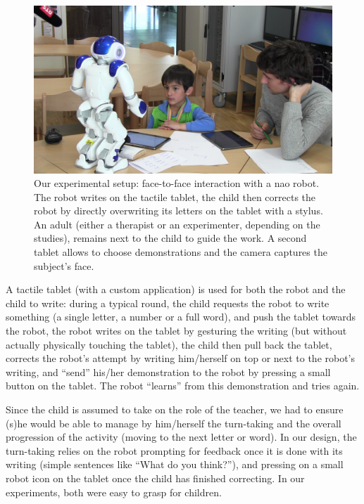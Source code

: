 \documentclass{sig-alternate}
\begin{document}
\begin{figure}[h!]
    \centering
    \includegraphics[width=1\columnwidth]{realSetup}
    \caption{\small Our experimental setup: face-to-face interaction with a {\sc
            nao} robot.  The robot writes on the tactile tablet, the child then
            corrects the robot by directly overwriting its letters on the tablet
            with a stylus. An adult (either a therapist or an experimenter,
            depending on the studies), remains next to the child to guide the work. 
            A second tablet allows to choose demonstrations and the camera captures the subject's face.}
    \label{fig:realSetup}
\end{figure}

A tactile tablet (with a custom application) is used for both the robot and the
child to write: during a typical round, the child requests the robot to write
something (a single letter, a number or a full word), and push the tablet
towards the robot, the robot writes on the tablet by gesturing the writing (but
without actually physically touching the tablet), the child then pull back the
tablet, corrects the robot's attempt by writing him/herself on top or next to
the robot's writing, and ``send'' his/her demonstration to the robot by pressing
a small button on the tablet. The robot ``learns'' from this demonstration and
tries again.

Since the child is assumed to take on the role of the teacher, we had to ensure
(s)he would be able to manage by him/herself the turn-taking and the overall
progression of the activity (moving to the next letter or word). In our design,
the turn-taking relies on the robot prompting for feedback once it is done with
its writing (simple sentences like ``What do you think?''), and pressing on a
small robot icon on the tablet once the child has finished correcting. In our
experiments, both were easy to grasp for children.
\end{document}
